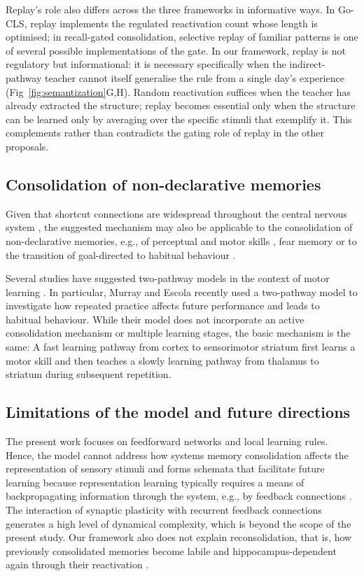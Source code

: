 Replay's role also differs across the three frameworks in informative ways. In Go-CLS, replay implements the regulated reactivation count whose length is optimised; in recall-gated consolidation, selective replay of familiar patterns is one of several possible implementations of the gate. In our framework, replay is not regulatory but informational: it is necessary specifically when the indirect-pathway teacher cannot itself generalise the rule from a single day's experience (Fig~\ref{fig:semantization}G,H). Random reactivation suffices when the teacher has already extracted the structure; replay becomes essential only when the structure can be learned only by averaging over the specific stimuli that exemplify it. This complements rather than contradicts the gating role of replay in the other proposals.

\subsection{Consolidation of non-declarative memories}

Given that shortcut connections are widespread throughout the central nervous system \cite{VanEssen1992, Morgenstern2016}, the suggested mechanism may also be applicable to the consolidation of non-declarative memories, e.g., of perceptual \cite{Karni1994} and motor skills \cite{Brashers-Krug1996}, fear memory \cite{Kitamura2017} or to the transition of goal-directed to habitual behaviour \cite{Aarts2000}.

Several studies have suggested two-pathway models in the context of motor learning \cite{Makino2016, Pyle2019, Tesileanu2017, Murray2020a}. In particular, Murray and Escola \cite{Murray2020a} recently used a two-pathway model to investigate how repeated practice affects future performance and leads to habitual behaviour.
While their model does not incorporate an active consolidation mechanism or multiple learning stages, the basic mechanism is the same:
A fast learning pathway from cortex to sensorimotor striatum first learns a motor skill and then teaches a slowly learning pathway from thalamus to striatum during subsequent repetition.

\subsection{Limitations of the model and future directions}

The present work focuses on feedforward networks and local learning rules. Hence, the model cannot address how systems memory consolidation affects the representation of sensory stimuli and forms schemata that facilitate future learning \cite{Tse2007, Tse2011} because representation learning typically requires a means of backpropagating information through the system, e.g., by feedback connections \cite{Lillicrap2020}. The interaction of synaptic plasticity with recurrent feedback connections generates a high level of dynamical complexity, which is beyond the scope of the present study. Our framework also does not explain reconsolidation, that is, how previously consolidated memories become labile and hippocampus-dependent again through their reactivation \cite{Debiec2002, Dudai2012}.

